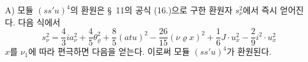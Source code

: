 
A) 모듈 $(ss'u)^4$의 환원은 \S\ 11의 공식 (16.)으로 구한 환원자 $s_\nu^2$에서 즉시 얻어진다. 다음 식에서
\[
 s_\nu^2=\frac43 i a_\nu^2+\frac45\theta_\varrho^2+\frac85(atu)^2-
 \frac{26}{15}(\nu\varrho x)^2+\frac16J\cdot u_x^2-
 \frac29i^2\cdot u_x^2
\]
$x$를 $\nu_1$에 따라 편극하면 다음을 얻는다.
이로써 모듈 $(ss'u)^4$가 환원된다.

